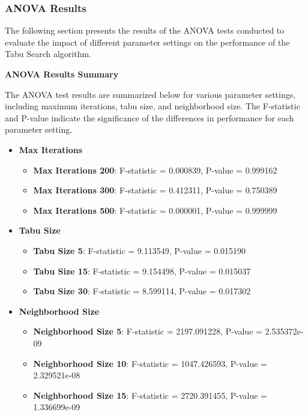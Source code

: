 \documentclass{article}
\begin{document}
    \subsubsection{ANOVA Results}

    The following section presents the results of the ANOVA tests conducted to evaluate the impact of different parameter settings on the performance of the Tabu Search algorithm.

    \textbf{ANOVA Results Summary}

    The ANOVA test results are summarized below for various parameter settings, including maximum iterations, tabu size, and neighborhood size. The F-statistic and P-value indicate the significance of the differences in performance for each parameter setting.

    \begin{itemize}
        \item \textbf{Max Iterations}
        \begin{itemize}
            \item \textbf{Max Iterations 200}: F-statistic = 0.000839, P-value = 0.999162
            \item \textbf{Max Iterations 300}: F-statistic = 0.412311, P-value = 0.750389
            \item \textbf{Max Iterations 500}: F-statistic = 0.000001, P-value = 0.999999
        \end{itemize}
        \item \textbf{Tabu Size}
        \begin{itemize}
            \item \textbf{Tabu Size 5}: F-statistic = 9.113549, P-value = 0.015190
            \item \textbf{Tabu Size 15}: F-statistic = 9.154498, P-value = 0.015037
            \item \textbf{Tabu Size 30}: F-statistic = 8.599114, P-value = 0.017302
        \end{itemize}
        \item \textbf{Neighborhood Size}
        \begin{itemize}
            \item \textbf{Neighborhood Size 5}: F-statistic = 2197.091228, P-value = 2.535372e-09
            \item \textbf{Neighborhood Size 10}: F-statistic = 1047.426593, P-value = 2.329521e-08
            \item \textbf{Neighborhood Size 15}: F-statistic = 2720.391455, P-value = 1.336699e-09
        \end{itemize}
    \end{itemize}
\end{document}
